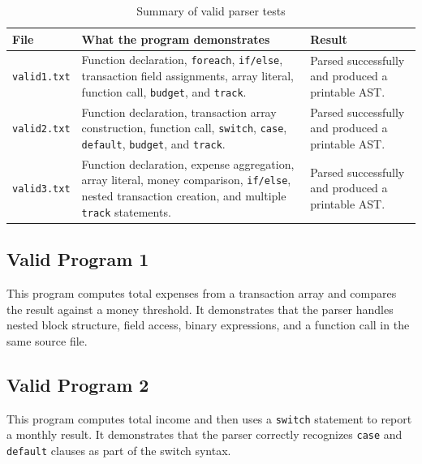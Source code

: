 \documentclass[11pt]{article}
\begin{document}
\begin{table}[h]
\centering
\small
\renewcommand{\arraystretch}{1.25}
\begin{tabularx}{\textwidth}{>{\raggedright\arraybackslash}p{} >{\raggedright\arraybackslash}X >{\raggedright\arraybackslash}p{}}
\toprule
\textbf{File} & \textbf{What the program demonstrates} & \textbf{Result} \\
\midrule
\texttt{valid1.txt} & Function declaration, \texttt{foreach}, \texttt{if/else}, transaction field assignments, array literal, function call, \texttt{budget}, and \texttt{track}. & Parsed successfully and produced a printable AST. \\
\texttt{valid2.txt} & Function declaration, transaction array construction, function call, \texttt{switch}, \texttt{case}, \texttt{default}, \texttt{budget}, and \texttt{track}. & Parsed successfully and produced a printable AST. \\
\texttt{valid3.txt} & Function declaration, expense aggregation, array literal, money comparison, \texttt{if/else}, nested transaction creation, and multiple \texttt{track} statements. & Parsed successfully and produced a printable AST. \\
\bottomrule
\end{tabularx}
\caption{Summary of valid parser tests}
\label{tab:valid-summary}
\end{table}

\subsection*{Valid Program 1}
This program computes total expenses from a transaction array and compares the result against a money threshold. It demonstrates that the parser handles nested block structure, field access, binary expressions, and a function call in the same source file.



\subsection*{Valid Program 2}
This program computes total income and then uses a \texttt{switch} statement to report a monthly result. It demonstrates that the parser correctly recognizes \texttt{case} and \texttt{default} clauses as part of the switch syntax.


\end{document}
